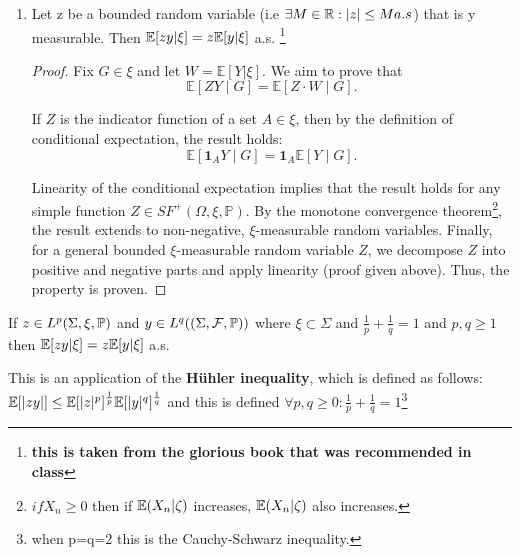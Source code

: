 \documentclass{article}
\begin{document}
\begin{enumerate}
    \item Let z be a bounded random variable (i.e \(\exists M \in \mathbb{R} : |z|\leq M a.s\)) that is y measurable. Then \(\mathbb{E}[zy|\xi]=z\mathbb{E}[y|\xi]\) a.s. \footnote{\textbf{this is taken from the glorious book that was recommended in class}}
    
    \begin{proof}
        Fix \(G \in \xi\) and let \(W = \mathbb{E}[Y|\xi]\). We aim to prove that
        \[
        \mathbb{E}[ZY \mid G] = \mathbb{E}[Z \cdot W \mid G].
        \]
        
        If \(Z\) is the indicator function of a set \(A \in \xi\), then by the definition of conditional expectation, the result holds:
        \[
        \mathbb{E}[\mathbf{1}_A Y \mid G] = \mathbf{1}_A \mathbb{E}[Y \mid G].
        \]
        
        Linearity of the conditional expectation implies that the result holds for any simple function \(Z \in SF^+(\Omega, \xi, \mathbb{P})\). By the monotone convergence theorem\footnote{ \(if X_n\geq 0\) then if  \( \mathbb{E}(X_n|\zeta)\) increases, \(\mathbb{E}(X_n|\zeta)\) also increases.}, the result extends to non-negative, \(\xi\)-measurable random variables. Finally, for a general bounded \(\xi\)-measurable random variable \(Z\), we decompose \(Z\) into positive and negative parts and apply linearity (proof given above). Thus, the property is proven.
        \end{proof}



\end{enumerate}

\begin{remark}
    If \(z\in L^{p}(\Sigma, \xi, \mathbb{P})\) and \(y\in L^{q}((\Sigma, \mathcal{F}, \mathbb{P}))\) where \(\xi \subset \Sigma\) and \(\frac{1}{p} + \frac{1}{q}=1\) and \(p,q\geq1\) then \(\mathbb{E}[zy|\xi]=z\mathbb{E}[y|\xi]\) a.s. 

    This is an application of the \textbf{Hühler inequality}, which is defined as follows: \(\mathbb{E}[|zy|]\leq \mathbb{E}[|z|^{p}]^{\frac{1}{p}}\mathbb{E}[|y|^{q}]^{\frac{1}{q}} \) and this is defined \(\forall p,q\geq 0 : \frac{1}{p} + \frac{1}{q}=1\)\footnote{when p=q=2 this is the Cauchy-Schwarz inequality.}
\end{remark}
\end{document}
